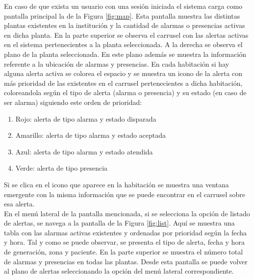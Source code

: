 En caso de que exista un usuario con una sesión iniciada el sistema carga como pantalla principal la de la Figura \ref{fig:map}. Esta pantalla muestra las distintas plantas existentes en la institución y la cantidad de alarmas o presencias activas en dicha planta. En la parte superior se observa el carrusel con las alertas activas en el sistema pertenecientes a la planta seleccionada. A la derecha se observa el plano de la planta seleccionada. En este plano además se muestra la información referente a la ubicación de alarmas y presencias. En cada habitación si hay alguna alerta activa se colorea el espacio y se muestra un icono de la alerta con más prioridad de las existentes en el carrusel pertenecientes a dicha habitación, coloreandola según el tipo de alerta (alarma o presencia) y su estado (en caso de ser alarma) siguiendo este orden de prioridad:
\begin{enumerate}
	\item Rojo: alerta de tipo alarma y estado disparada
	\item Amarillo: alerta de tipo alarma y estado aceptada
	\item Azul: alerta de tipo alarma y estado atendida
	\item Verde: alerta de tipo presencia
\end{enumerate}
Si se clica en el icono que aparece en la habitación se muestra una ventana emergente con la misma información que se puede encontrar en el carrusel sobre esa alerta.\\

En el menú lateral de la pantalla mencionada, si se selecciona la opción de listado de alertas, se navega a la pantalla de la Figura \ref{fig:list}. Aquí se muestra una tabla con las alarmas activas existentes y ordenadas por prioridad según la fecha y hora. Tal y como se puede observar, se presenta el tipo de alerta, fecha y hora de generación, zona y paciente. En la parte superior se muestra el número total de alarmas y presencias en todas las plantas. Desde esta pantalla se puede volver al plano de alertas seleccionando la opción del menú lateral correspondiente.


\newpage

